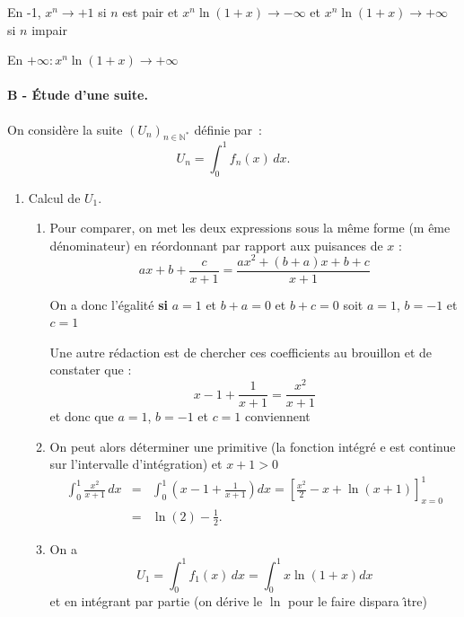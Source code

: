 \begin{correction}
\begin{enumerate}
\begin{enumerate}
En -1, $x^{n}\rightarrow +1$ si $n$ est pair et $x^{n}\ln (1+x)\rightarrow
-\infty $ et $x^{n}\ln (1+x)\rightarrow +\infty $ si $n$ impair

En $+\infty :x^{n}\ln (1+x)\rightarrow +\infty $
\end{enumerate}
\end{enumerate}

\paragraph{B - \'{E}tude d'une suite.}

On consid\`ere la suite $\left(U_n\right)_{n\in\mathbb{N}^*}$ d\'efinie
par~: 
\begin{equation*}
U_n=\int_0^1f_n(x)\,dx.
\end{equation*}

\begin{enumerate}
\item Calcul de $U_1$.
\begin{enumerate}
\item Pour comparer, on met les deux expressions sous la m\^{e}me forme (m%
\^{e}me d\'{e}nominateur) en r\'{e}ordonnant par rapport aux puisances de $x$
: 
\begin{equation*}
ax+b+\frac{c}{x+1}=\frac{ax^{2}+\left( b+a\right) x+b+c}{x+1}
\end{equation*}

On a donc l'\'{e}galit\'{e} \textbf{si} $a=1$ et $b+a=0$ et $b+c=0$ soit $%
a=1 $, $b=-1$ et $c=1$

Une autre r\'{e}daction est de chercher ces coefficients au brouillon et de
constater que : 
\begin{equation*}
x-1+\frac{1}{x+1}=\frac{x^{2}}{x+1}
\end{equation*}%
et donc que $a=1$, $b=-1$ et $c=1$ conviennent

\item On peut alors d\'{e}terminer une primitive (la fonction int\'{e}gr\'{e}%
e est continue sur l'intervalle d'int\'{e}gration) et $x+1>0$ 
\begin{eqnarray*}
\int_{0}^{1}\frac{x^{2}}{x+1}\,dx &=&\int_{0}^{1}\left( x-1+\frac{1}{x+1}%
\right) dx=\left[ \frac{x^{2}}{2}-x+\ln \left( x+1\right) \right] _{x=0}^{1}
\\
&=&\ln \left( 2\right) -\frac{1}{2}.
\end{eqnarray*}

\item On a 
\begin{equation*}
U_{1}=\int_{0}^{1}f_{1}(x)\,dx=\int_{0}^{1}x\ln \left( 1+x\right) dx
\end{equation*}%
et en int\'{e}grant par partie (on d\'{e}rive le $\ln $ pour le faire dispara%
\^{\i}tre)


\end{enumerate}
\end{enumerate}
\end{correction}
